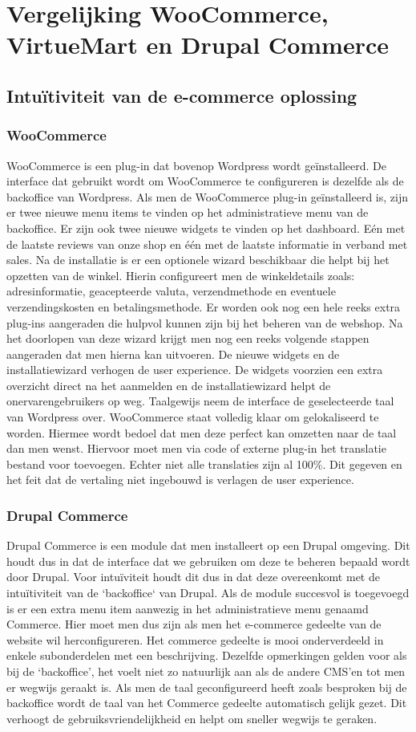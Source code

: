 \section{Vergelijking WooCommerce, VirtueMart en Drupal Commerce }
\subsection{Intuïtiviteit van de e-commerce oplossing}
\subsubsection{WooCommerce}
WooCommerce is een plug-in dat bovenop Wordpress wordt geïnstalleerd. De interface dat gebruikt wordt om WooCommerce te configureren is dezelfde als de backoffice van Wordpress. Als men de WooCommerce plug-in geïnstalleerd is, zijn er twee nieuwe menu items te vinden op het administratieve menu van de backoffice. Er zijn ook twee nieuwe widgets te vinden op het dashboard. Eén met de laatste reviews van onze shop en één met de laatste informatie in verband met sales. Na de installatie is er een optionele wizard beschikbaar die helpt bij het opzetten van de winkel. Hierin configureert men de winkeldetails zoals: adresinformatie, geacepteerde valuta, verzendmethode en eventuele verzendingskosten en betalingsmethode. Er worden ook nog een hele reeks extra plug-ins aangeraden die hulpvol kunnen zijn bij het beheren van de webshop. Na het doorlopen van deze wizard krijgt men nog een reeks volgende stappen aangeraden dat men hierna kan uitvoeren. De nieuwe widgets en de installatiewizard verhogen de user experience. De widgets voorzien een extra overzicht direct na het aanmelden en de installatiewizard helpt de onervarengebruikers op weg. Taalgewijs neem de interface de geselecteerde taal van Wordpress over. WooCommerce staat volledig klaar om gelokaliseerd te worden. Hiermee wordt bedoel dat men deze perfect kan omzetten naar de taal dan men wenst. Hiervoor moet men via code of externe plug-in het translatie bestand voor toevoegen. Echter niet alle translaties zijn al 100\%. Dit gegeven en het feit dat de vertaling niet ingebouwd is verlagen de user experience.
\subsubsection{Drupal Commerce}
Drupal Commerce is een module dat men installeert op een Drupal omgeving. Dit houdt dus in dat de interface dat we gebruiken om deze te beheren bepaald wordt door Drupal. Voor intuïviteit houdt dit dus in dat deze overeenkomt met de intuïtiviteit van de `backoffice` van Drupal. Als de module succesvol is toegevoegd is er een extra menu item aanwezig in het administratieve menu genaamd Commerce. Hier moet men dus zijn als men het e-commerce gedeelte van de website wil herconfigureren. Het commerce gedeelte is mooi onderverdeeld in enkele subonderdelen met een beschrijving. Dezelfde opmerkingen gelden voor als bij de `backoffice', het voelt niet zo natuurlijk aan als de andere CMS'en tot men er wegwijs geraakt is. Als men de taal geconfigureerd heeft zoals besproken bij de backoffice wordt de taal van het Commerce gedeelte automatisch gelijk gezet. Dit verhoogt de gebruiksvriendelijkheid en helpt om sneller wegwijs te geraken.
